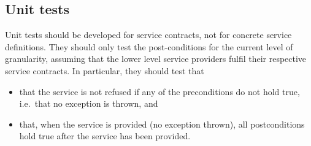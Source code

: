 \subsection{Unit tests}

Unit tests should be developed for service contracts, not for concrete service definitions. They should only test the post-conditions for the current level of granularity, assuming that the lower level service providers fulfil their respective service contracts. In particular, they should test that
\begin{itemize}
  \item that the service is not refused if any of the preconditions do not hold true, i.e.\ that no exception is thrown, and
  \item that, when the service is provided (no exception thrown), all postconditions hold true after the service has been provided.
\end{itemize}

